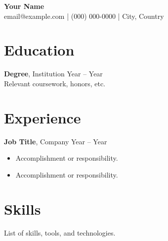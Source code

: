 \documentclass[11pt,a4paper]{article}
\begin{document}
\begin{center}
    {\LARGE \textbf{Your Name}}\\[4pt]
    email@example.com \quad | \quad (000) 000-0000 \quad | \quad City, Country
\end{center}

\section*{Education}
\textbf{Degree}, Institution \hfill Year -- Year\\
Relevant coursework, honors, etc.

\section*{Experience}
\textbf{Job Title}, Company \hfill Year -- Year
\begin{itemize}[leftmargin=1.2em]
    \item Accomplishment or responsibility.
    \item Accomplishment or responsibility.
\end{itemize}

\section*{Skills}
List of skills, tools, and technologies.
\end{document}
